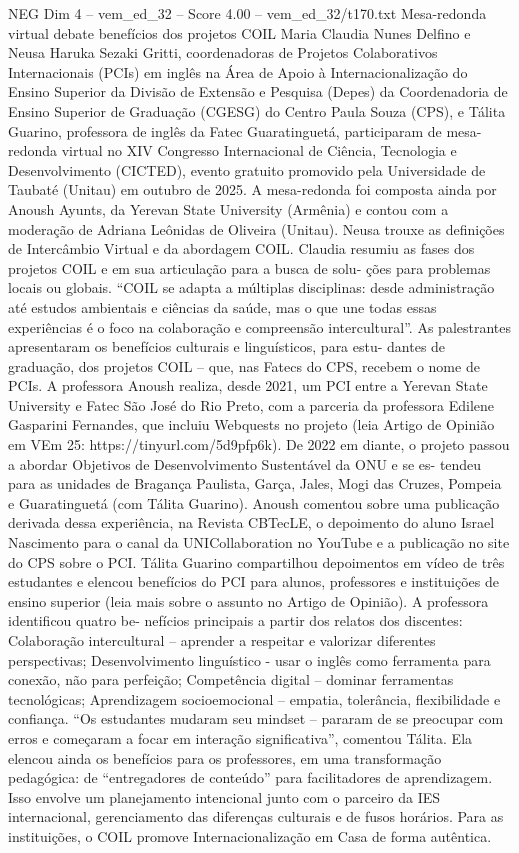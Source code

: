 \begin{textsample}{NEG Dim 4 – vem\_ed\_32 – Score 4.00 – vem\_ed\_32/t170.txt}  \label{ex:f4_neg_137}
Mesa-redonda virtual debate benefícios dos projetos COIL Maria Claudia Nunes Delfino e Neusa Haruka Sezaki Gritti, coordenadoras de Projetos Colaborativos Internacionais (PCIs) em inglês na Área de Apoio à Internacionalização do Ensino Superior da Divisão de Extensão e Pesquisa (Depes) da Coordenadoria de Ensino Superior de Graduação (CGESG) do Centro Paula Souza (CPS), e Tálita Guarino, professora de inglês da Fatec Guaratinguetá, participaram de mesa-redonda virtual no XIV Congresso Internacional de Ciência, Tecnologia e Desenvolvimento (CICTED), evento gratuito promovido pela Universidade de Taubaté (Unitau) em outubro de 2025.
A mesa-redonda foi composta ainda por Anoush Ayunts, da Yerevan State University (Armênia) e contou com a moderação de Adriana Leônidas de Oliveira (Unitau).
Neusa trouxe as definições de Intercâmbio Virtual e da abordagem COIL.
Claudia resumiu as fases dos projetos COIL e em sua articulação para a busca de solu- ções para problemas locais ou globais. “COIL se adapta a múltiplas disciplinas: desde administração até estudos ambientais e ciências da saúde, mas o que une todas essas experiências é o foco na colaboração e compreensão intercultural”.
As palestrantes apresentaram os benefícios culturais e linguísticos, para estu- dantes de graduação, dos projetos COIL – que, nas Fatecs do CPS, recebem o nome de PCIs.
A professora Anoush realiza, desde 2021, um PCI entre a Yerevan State University e Fatec São José do Rio Preto, com a parceria da professora Edilene Gasparini Fernandes, que incluiu Webquests no projeto (leia Artigo de Opinião em VEm 25: https://tinyurl.com/5d9pfp6k).
De 2022 em diante, o projeto passou a abordar Objetivos de Desenvolvimento Sustentável da ONU e se es- tendeu para as unidades de Bragança Paulista, Garça, Jales, Mogi das Cruzes, Pompeia e Guaratinguetá (com Tálita Guarino).
Anoush comentou sobre uma publicação derivada dessa experiência, na Revista CBTecLE, o depoimento do aluno Israel Nascimento para o canal da UNICollaboration no YouTube e a publicação no site do CPS sobre o PCI.
Tálita Guarino compartilhou depoimentos em vídeo de três estudantes e elencou benefícios do PCI para alunos, professores e instituições de ensino superior (leia mais sobre o assunto no Artigo de Opinião).
A professora identificou quatro be- nefícios principais a partir dos relatos dos discentes: Colaboração intercultural – aprender a respeitar e valorizar diferentes perspectivas; Desenvolvimento linguístico - usar o inglês como ferramenta para conexão, não para perfeição; Competência digital – dominar ferramentas tecnológicas; Aprendizagem socioemocional – empatia, tolerância, flexibilidade e confiança. “Os estudantes mudaram seu mindset – pararam de se preocupar com erros e começaram a focar em interação significativa”, comentou Tálita.
Ela elencou ainda os benefícios para os professores, em uma transformação pedagógica: de “entregadores de conteúdo” para facilitadores de aprendizagem.
Isso envolve um planejamento intencional junto com o parceiro da IES internacional, gerenciamento das diferenças culturais e de fusos horários.
Para as instituições, o COIL promove Internacionalização em Casa de forma autêntica.

\end{textsample}
